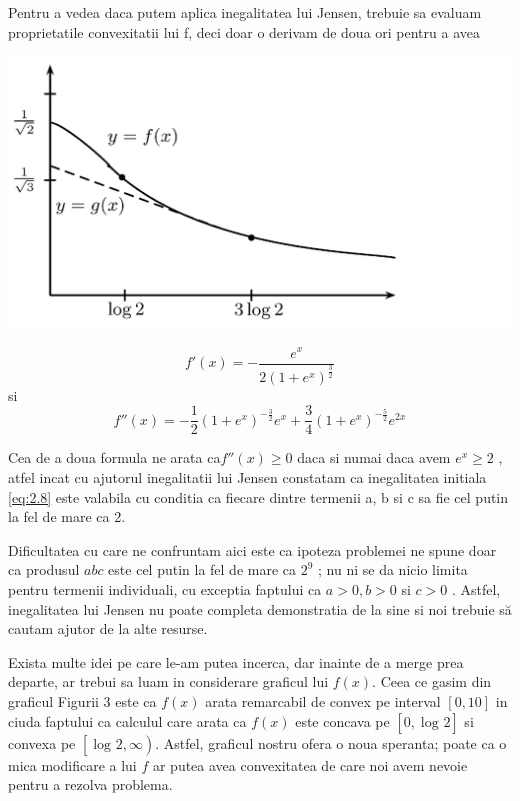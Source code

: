 \documentclass[a4paper,12pt,oneside]{report}
\begin{document}
Pentru a vedea daca putem aplica inegalitatea lui Jensen, trebuie sa evaluam proprietatile convexitatii lui f,  deci doar o derivam de doua ori pentru a avea  

\begin{center}
	\includegraphics[width=1.0\textwidth]{fig_pb3.png}
\end{center}

\begin{displaymath}
  {f}'\left ( x \right ) = -\frac{e^{x}}{2 \left ( 1 + e^{x} \right )^{\frac{3}{2}}}
\end{displaymath}
si
\begin{displaymath}
  {f}''\left ( x \right ) = -\frac{1}{2}\left (  1 + e^{x} \right )^{-\frac{3}{2}}e^{x} + \frac{3}{4}\left ( 1 + e^{x} \right )^{-\frac{5}{2}}e^{2x}
\end{displaymath}

Cea de a doua formula ne arata ca\({f}''\left ( x \right ) \geq 0\) daca si numai daca avem \(e^{x}\geq 2\) , atfel incat cu ajutorul inegalitatii lui Jensen  constatam ca inegalitatea initiala \ref{eq:2.8}  este valabila cu conditia ca fiecare dintre termenii a, b si c sa fie cel putin la fel de mare ca 2. 

Dificultatea cu care ne confruntam aici este ca ipoteza problemei  ne spune doar  ca produsul \(abc\) este cel putin la fel de mare ca \(2^{9}\) ; nu ni se da nicio  limita pentru termenii  individuali, cu exceptia faptului ca \( a > 0, b > 0 \) si \(c > 0\) . Astfel, inegalitatea lui Jensen nu poate completa demonstratia de la sine si noi trebuie să cautam ajutor de la alte resurse. 

Exista multe idei pe care le-am putea incerca, dar inainte de a merge prea departe,  ar trebui sa luam in considerare graficul lui \(f\left ( x \right )\). Ceea ce  gasim  din graficul  Figurii 3 este ca \(f\left ( x \right ) \) arata remarcabil de convex pe interval \(\left [ 0, 10 \right ]  \) in ciuda faptului ca calculul care arata ca \(f\left ( x \right ) \) este concava pe \(\left [ 0, \log _{} 2\right ] \) si convexa pe \(\left [ \log _{} 2 , \infty \right ) \). Astfel, graficul nostru ofera o noua speranta; poate ca o mica modificare a lui \(f\) ar putea avea convexitatea de care noi avem nevoie pentru a rezolva problema.
\end{document}
